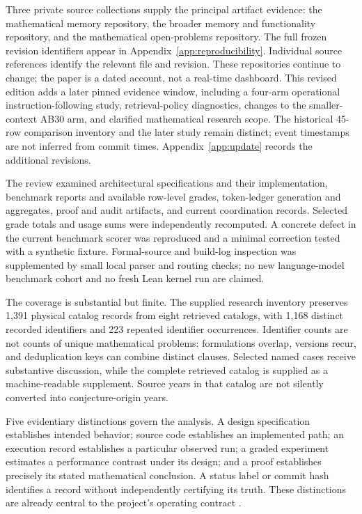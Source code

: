 Three private source collections supply the principal artifact evidence: the mathematical memory repository, the broader memory and functionality repository, and the mathematical open-problems repository. The full frozen revision identifiers appear in Appendix~\ref{app:reproducibility}. Individual source references identify the relevant file and revision. These repositories continue to change; the paper is a dated account, not a real-time dashboard. This revised edition adds a later pinned evidence window, including a four-arm operational instruction-following study, retrieval-policy diagnostics, changes to the smaller-context AB30 arm, and clarified mathematical research scope. The historical 45-row comparison inventory and the later study remain distinct; event timestamps are not inferred from commit times. Appendix~\ref{app:update} records the additional revisions.

The review examined architectural specifications and their implementation, benchmark reports and available row-level grades, token-ledger generation and aggregates, proof and audit artifacts, and current coordination records. Selected grade totals and usage sums were independently recomputed. A concrete defect in the current benchmark scorer was reproduced and a minimal correction tested with a synthetic fixture. Formal-source and build-log inspection was supplemented by small local parser and routing checks; no new language-model benchmark cohort and no fresh Lean kernel run are claimed.

The coverage is substantial but finite. The supplied research inventory preserves 1,391 physical catalog records from eight retrieved catalogs, with 1,168 distinct recorded identifiers and 223 repeated identifier occurrences. Identifier counts are not counts of unique mathematical problems: formulations overlap, versions recur, and deduplication keys can combine distinct clauses. Selected named cases receive substantive discussion, while the complete retrieved catalog is supplied as a machine-readable supplement. Source years in that catalog are not silently converted into conjecture-origin years.

Five evidentiary distinctions govern the analysis. A design specification establishes intended behavior; source code establishes an implemented path; an execution record establishes a particular observed run; a graded experiment estimates a performance contrast under its design; and a proof establishes precisely its stated mathematical conclusion. A status label or commit hash identifies a record without independently certifying its truth. These distinctions are already central to the project's operating contract \citep{canonical,matharchitecture}.

